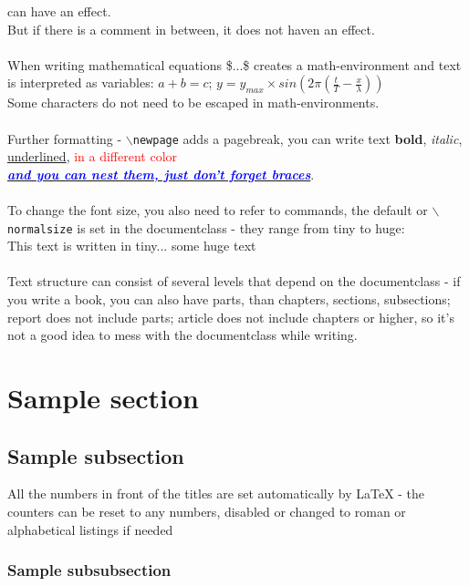 can have an effect.\\
But if there is a comment in between,
it does not haven an effect.
\\
\\ When writing mathematical equations \$...\$ creates a math-environment and text is interpreted as variables: $a+b=c$; $y = y_{max} \times sin(2\pi(\frac{t}{T} - \frac{x}{\lambda}) )$ \\
Some characters do not need to be escaped in math-environments.
\\
\\ Further formatting - \texttt{$\backslash$newpage} adds a pagebreak, you can write text \textbf{bold}, \textit{italic}, \underline{underlined}, \textcolor{red}{in a different color} \\
\textbf{\textit{\underline{\textcolor{blue}{and you can nest them, just don't forget braces}}}}.
\\
\\ To change the font size, you also need to refer to commands, the default or \texttt{$\backslash$normalsize} is set in the documentclass - they range from tiny to huge:\\
{\tiny This text is written in tiny...}
{\huge some huge text}
\\
\\ Text structure can consist of several levels that depend on the documentclass - if you write a book, you can also have parts, than chapters, sections, subsections; report does not include parts; article does not include chapters or higher, so it's not a good idea to mess with the documentclass while writing.
\section{Sample section}
\subsection{Sample subsection}
All the numbers in front of the titles are set automatically by LaTeX - the counters can be reset to any numbers, disabled or changed to roman or alphabetical listings if needed
\subsubsection{Sample subsubsection}
